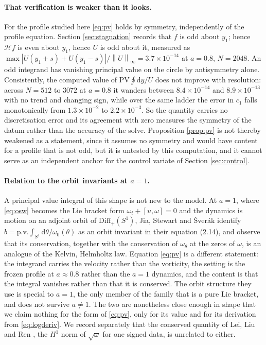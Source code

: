 \documentclass[11pt]{article}
\theoremstyle{definition}
\newcommand{\Hil}{\mathcal{H}}
\newcommand{\norm}[1]{\left\lVert #1 \right\rVert}
\newcommand{\abs}[1]{\left\lvert #1 \right\rvert}
\begin{document}
\paragraph{That verification is weaker than it looks.} For the profile studied
here \eqref{eq:pv} holds by symmetry, independently of the profile equation.
Section \ref{sec:stagnation} records that $f$ is odd about $y_1$; hence
$\Hil f$ is even about $y_1$, hence $U$ is odd about it, measured as
$\max\abs{U(y_1+s)+U(y_1-s)}/\norm{U}_\infty = 3.7\times10^{-14}$ at $a=0.8$,
$N=2048$. An odd integrand has vanishing principal value on the circle by
antisymmetry alone. Consistently, the computed value of
$\mathrm{PV}\oint\mathrm{d}y/U$ does not improve with resolution: across
$N=512$ to $3072$ at $a=0.8$ it wanders between $8.4\times10^{-14}$ and
$8.9\times10^{-13}$ with no trend and changing sign, while over the same ladder
the error in $c_1$ falls monotonically from $1.3\times10^{-2}$ to
$2.2\times10^{-3}$. So the quantity carries no discretisation error and its
agreement with zero measures the symmetry of the datum rather than the accuracy
of the solve. Proposition \ref{prop:pv} is not thereby weakened as a statement,
since it assumes no symmetry and would have content for a profile that is not
odd, but it is untested by this computation, and it cannot serve as an
independent anchor for the control variate of Section \ref{sec:control}.

\paragraph{Relation to the orbit invariants at $a=1$.} A principal value
integral of this shape is not new to the model. At $a=1$, where \eqref{eq:osw}
becomes the Lie bracket form $\omega_t + [u,\omega]=0$ and the dynamics is
motion on an adjoint orbit of $\mathrm{Diff}_+(S^1)$, Jia, Stewart and
\v{S}ver\'{a}k \cite{jss2019} identify
$b = \mathrm{p.v.}\int_{S^1}\mathrm{d}\theta/\omega_0(\theta)$ as an orbit
invariant in their equation (2.14), and observe that its conservation, together
with the conservation of $\omega_\theta$ at the zeros of $\omega$, is an
analogue of the Kelvin, Helmholtz law. Equation \eqref{eq:pv} is a different
statement: the integrand carries the velocity rather than the vorticity, the
setting is the frozen profile at $a\approx0.8$ rather than the $a=1$ dynamics,
and the content is that the integral vanishes rather than that it is conserved.
The orbit structure they use is special to $a=1$, the only member of the family
that is a pure Lie bracket, and does not survive $a\ne1$. The two are
nonetheless close enough in shape that we claim nothing for the form of
\eqref{eq:pv}, only for its value and for its derivation from
\eqref{eq:logderiv}. We record separately that the conserved quantity of Lei,
Liu and Ren \cite{llr2020}, the $H^1$ norm of $\sqrt{\omega}$ for one signed
data, is unrelated to either.
\end{document}
